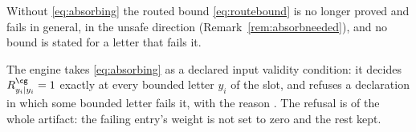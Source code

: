
Without \eqref{eq:absorbing} the routed bound \eqref{eq:routebound} is no
longer proved and fails in general, in the unsafe direction
(Remark~\ref{rem:absorbneeded}), and no bound is stated for a letter that
fails it.

\begin{requirement}\label{req:absorbing-bounded-letters}
The engine takes \eqref{eq:absorbing} as a declared input validity condition:
it decides $R^{\cg}_{y_i|y_i}=1$ exactly at every bounded letter $y_i$ of the
slot, and refuses a declaration in which some bounded letter fails it, with
the reason . The refusal is of the whole
artifact: the failing entry's weight is not set to zero and the rest kept.
\end{requirement}
